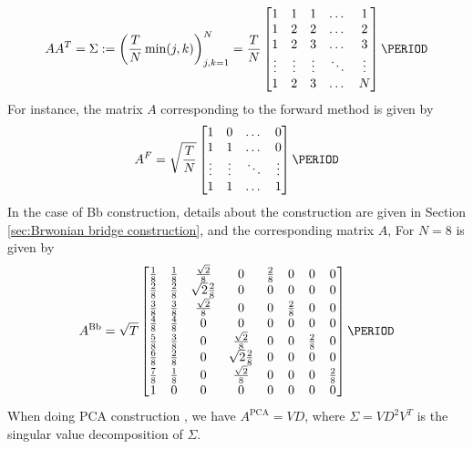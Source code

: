 \begin{equation}\label{eq:covariance_matrix_in_time}
A A^T =\Sigma:= \left(\frac{T}{N} \min(j,k)\right)_{j,k=1}^N=\frac{T}{N} \begin{bmatrix}
	1       & 1 & 1 & \dots & 1\\
	1     & 2 & 2 & \dots & 2 \\
	1     & 2& 3 & \dots &3 \\
	\vdots    & \vdots& \vdots & \ddots &\vdots \\
	1      & 2 & 3 & \dots &N
\end{bmatrix}
\PERIOD
\end{equation}   
For instance, the matrix $A$ corresponding to the forward method is given by 
\begin{equation*}
	A^{F} = \sqrt{\frac{T}{N}}  \begin{bmatrix}
		1       & 0  & \dots & 0\\
		1     & 1  & \dots & 0 \\
		\vdots    & \vdots & \ddots &\vdots \\
		1      & 1&  \dots &1
	\end{bmatrix}
	\PERIOD
\end{equation*}  
In the case of Bb construction, details about the construction are given in Section \ref{sec:Brwonian bridge construction}, and  the corresponding matrix $A$, For $N=8$ is given by 
 \begin{equation*}
 	A^{\text{Bb}} = \sqrt{T}  \begin{bmatrix}
 		\frac{1}{8}       & 	\frac{1}{8}   & 	\frac{\sqrt{2}}{8} & 0 &\frac{2}{8}  & 0 &0 & 0\\
 	\frac{2}{8}       & 	\frac{2}{8}   & 	\sqrt{2}\frac{ 2}{8} & 0 &0 & 0 &0 & 0\\
 		\frac{3}{8}       & 	\frac{3}{8}   & 	\frac{\sqrt{2}}{8} & 0 &0 &\frac{2}{8} &0  &0 \\
 		 	\frac{4}{8}       & 	\frac{4}{8}   & 	0 & 0 &0 & 0 &0 & 0\\
 		 	\frac{5}{8}       & 	\frac{3}{8}   & 	0 & \frac{\sqrt{2}}{8} &0 &0 &\frac{2}{8} &0 \\
 		 		\frac{6}{8}       & 	\frac{2}{8}   & 	0 & \sqrt{2}\frac{ 2}{8}  &0 & 0 &0 & 0\\
 		 			\frac{7}{8}       & 	\frac{1}{8}   & 	0 & \frac{\sqrt{2}}{8} &0 &0 &0 &\frac{2}{8}  \\
 		 			1       & 0  & 	0 & 0 &0 &0 &0 &0 \\
 	
 	\end{bmatrix}
 	\PERIOD
 \end{equation*}
When doing PCA construction \cite{acworth1998comparison}, we have $A^{\text{PCA}}=VD$, where $\Sigma=V D^2V^T$ is the singular value decomposition of $\Sigma$. 

